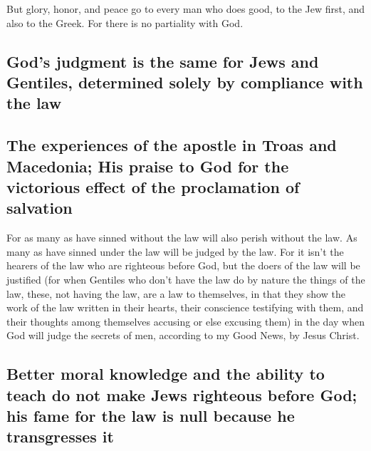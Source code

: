  But glory, honor, and peace go to every man who does
good, to the Jew first, and also to the Greek.  For there
is no partiality with God.

\hypertarget{gods-judgment-is-the-same-for-jews-and-gentiles-determined-solely-by-compliance-with-the-law}{%
\subsection{God's judgment is the same for Jews and Gentiles, determined
solely by compliance with the
law}\label{gods-judgment-is-the-same-for-jews-and-gentiles-determined-solely-by-compliance-with-the-law}}

\hypertarget{the-experiences-of-the-apostle-in-troas-and-macedonia-his-praise-to-god-for-the-victorious-effect-of-the-proclamation-of-salvation}{%
\subsection{The experiences of the apostle in Troas and Macedonia; His
praise to God for the victorious effect of the proclamation of
salvation}\label{the-experiences-of-the-apostle-in-troas-and-macedonia-his-praise-to-god-for-the-victorious-effect-of-the-proclamation-of-salvation}}

 For as many as have sinned without the law will also
perish without the law. As many as have sinned under the law will be
judged by the law.  For it isn't the hearers of the law
who are righteous before God, but the doers of the law will be justified
 (for when Gentiles who don't have the law do by nature
the things of the law, these, not having the law, are a law to
themselves,  in that they show the work of the law
written in their hearts, their conscience testifying with them, and
their thoughts among themselves accusing or else excusing them)
 in the day when God will judge the secrets of men,
according to my Good News, by Jesus Christ.

\hypertarget{better-moral-knowledge-and-the-ability-to-teach-do-not-make-jews-righteous-before-god-his-fame-for-the-law-is-null-because-he-transgresses-it}{%
\subsection{Better moral knowledge and the ability to teach do not make
Jews righteous before God; his fame for the law is null because he
transgresses
it}\label{better-moral-knowledge-and-the-ability-to-teach-do-not-make-jews-righteous-before-god-his-fame-for-the-law-is-null-because-he-transgresses-it}}

